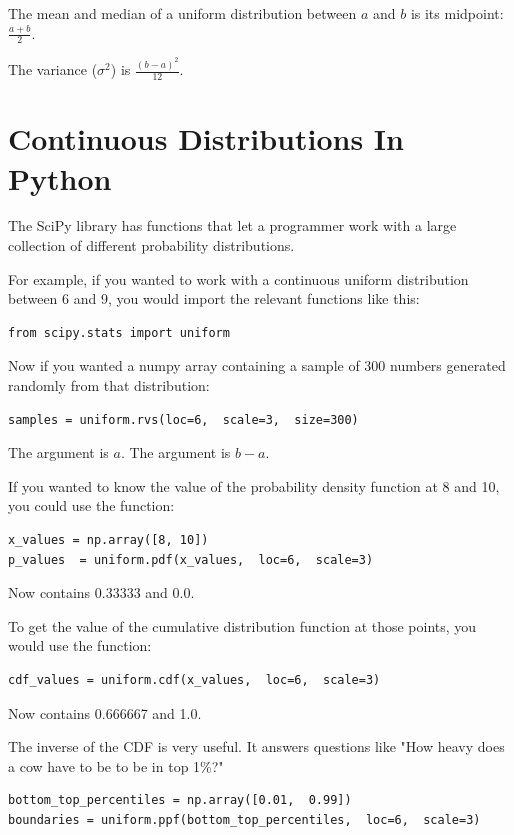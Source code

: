 The mean and median of a uniform distribution between $a$ and $b$ is its midpoint:  $\frac{a+b}{2}$.

The variance ($\sigma^2$) is $\frac{(b -a)^2}{12}$.

\section{Continuous Distributions In Python}

The SciPy library has functions that let a programmer work with a large collection of different probability distributions.

For example,  if you wanted to work with a continuous uniform distribution between 6 and 9,  you would import the relevant
functions like this:

\begin{verbatim}
from scipy.stats import uniform
\end{verbatim}

Now if you wanted a numpy array containing a sample of 300 numbers generated randomly from that distribution:

\begin{verbatim}
samples = uniform.rvs(loc=6,  scale=3,  size=300)
\end{verbatim}

The  argument is $a$.  The  argument is $b - a$.

If you wanted to know the value of the probability density function at 8 and 10, you could use the  function:

\begin{verbatim}
x_values = np.array([8, 10])
p_values  = uniform.pdf(x_values,  loc=6,  scale=3)
\end{verbatim}

Now  contains 0.33333 and 0.0.

To get the value of the cumulative distribution function at those points,  you would use the  function:

\begin{verbatim}
cdf_values = uniform.cdf(x_values,  loc=6,  scale=3)
\end{verbatim}

Now  contains 0.666667 and 1.0.

The inverse of the CDF is very useful.   It answers questions like "How heavy does a cow have to be to be in top 1\%?"

\begin{verbatim}
bottom_top_percentiles = np.array([0.01,  0.99])
boundaries = uniform.ppf(bottom_top_percentiles,  loc=6,  scale=3)
\end{verbatim}

